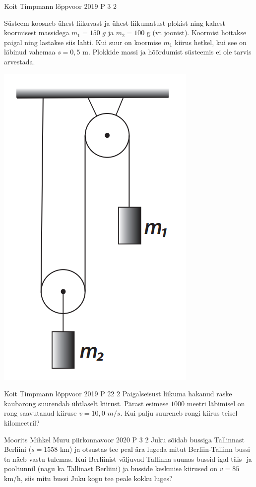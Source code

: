 \documentclass[11pt]{article}
\begin{document}
{%
{Koit Timpmann} %
{lõppvoor} %
{2019} %
{P 3} %
{2} %
{
\ifStatement
Süsteem koosneb ühest liikuvast ja ühest liikumatust plokist ning kahest koormisest massidega $m_1 = 150$ $g$ ja $m_2 = 100$ g (vt joonist). Koormisi hoitakse paigal ning lastakse siis lahti. Kui suur on koormise $m_1$ kiirus hetkel, kui see on läbinud vahemaa $s = 0,5$ m. Plokkide massi ja hõõrdumist süsteemis ei ole tarvis arvestada.
\begin{center}
	\includegraphics[width=0.5\linewidth]{2019-v3p-03-yl.PNG}
\end{center}
\fi
}

{Koit Timpmann} %
{lõppvoor} %
{2019} %
{P 22} %
{2} %
{
\ifStatement
Paigalseisust liikuma hakanud raske kaubarong suurendab ühtlaselt kiirust. Pärast esimese $1000$ meetri läbimisel on rong saavutanud kiiruse $v = 10,0$ $m/s$. Kui palju suureneb rongi kiirus teisel kilomeetril?
\fi
}

{Moorits Mihkel Muru} %
{piirkonnavoor} %
{2020} %
{P 3} %
{2} %
{
\ifStatement
Juku sõidab bussiga Tallinnast Berliini ($s = 1558$ km) ja otsustas tee peal ära lugeda mitut Berliin-Tallinn bussi ta näeb vastu tulemas. Kui Berliinist väljuvad Tallinna suunas bussid igal täis- ja pooltunnil (nagu ka Tallinast Berliini) ja busside keskmise kiirused on $v = 85$ km/h, siis mitu bussi Juku kogu tee peale kokku luges?
\fi
}


}
\end{document}
